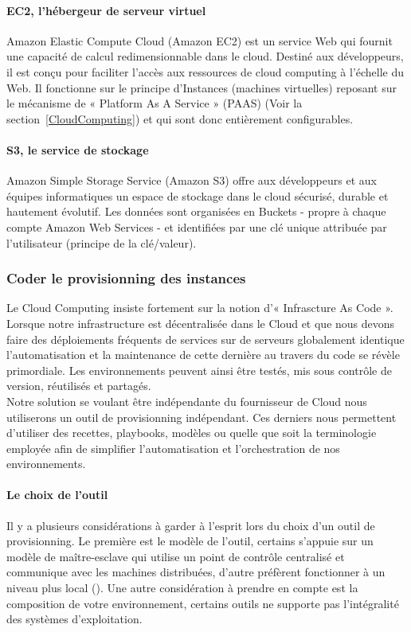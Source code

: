           \paragraph{EC2, l'hébergeur de serveur virtuel}
          Amazon Elastic Compute Cloud (Amazon EC2) est un service Web qui fournit une capacité de calcul redimensionnable dans le cloud. Destiné aux développeurs, il est conçu pour faciliter l'accès aux ressources de cloud computing à l'échelle du Web. Il fonctionne sur le principe d'Instances (machines virtuelles) reposant sur le mécanisme de « Platform As A Service » (PAAS) (Voir la section~\ref{CloudComputing}) et qui sont donc entièrement configurables.

          \paragraph{S3, le service de stockage}
          Amazon Simple Storage Service (Amazon S3) offre aux développeurs et aux équipes informatiques un espace de stockage dans le cloud sécurisé, durable et hautement évolutif. Les données sont organisées en Buckets - propre à chaque compte Amazon Web Services - et identifiées par une clé unique attribuée par l'utilisateur (principe de la clé/valeur).

        \subsubsection{Coder le provisionning des instances}
        Le Cloud Computing insiste fortement sur la notion d'« Infrascture As Code ». Lorsque notre infrastructure est décentralisée dans le Cloud et que nous devons faire des déploiements fréquents de services sur de serveurs globalement identique l'automatisation et la maintenance de cette dernière au travers du code se révèle primordiale. Les environnements peuvent ainsi être testés, mis sous contrôle de version, réutilisés et partagés.\\

        Notre solution se voulant être indépendante du fournisseur de Cloud nous utiliserons un outil de provisionning indépendant. Ces derniers nous permettent d'utiliser des recettes, playbooks, modèles ou quelle que soit la terminologie employée afin de simplifier l'automatisation et l'orchestration de nos environnements.

          \paragraph{Le choix de l'outil}
          Il y a plusieurs considérations à garder à l'esprit lors du choix d'un outil de provisionning. Le première est le modèle de l'outil, certains s'appuie sur un modèle de maître-esclave qui utilise un point de contrôle centralisé et communique avec les machines distribuées, d'autre préfèrent fonctionner à un niveau plus local (). Une autre considération à prendre en compte est la composition de votre environnement, certains outils ne supporte pas l'intégralité des systèmes d'exploitation.

